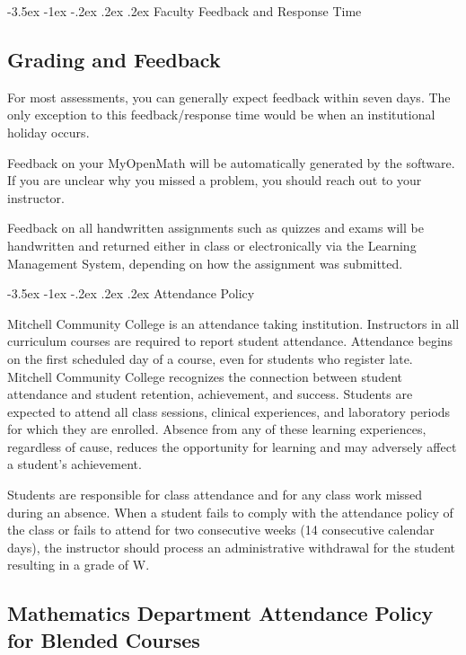 \documentclass{article}
\makeatletter
\renewcommand\section{\@startsection{section}{1}{0pt}%
  {-3.5ex \@plus -1ex \@minus -.2ex}%
  {.2ex \@plus.2ex}%
  {\normalfont\Large\bfseries}} %
\makeatother
\begin{document}
\section{Faculty Feedback and Response Time}

\subsection{Grading and Feedback}

For most assessments, you can generally expect feedback within seven days. The only exception to this feedback/response time would be when an institutional holiday occurs.

Feedback on your MyOpenMath will be automatically generated by the software. If you are unclear why you missed a problem, you should reach out to your instructor.

Feedback on all handwritten assignments such as quizzes and exams will be handwritten and returned either in class or electronically via the Learning Management System, depending on how the assignment was submitted.

\section{Attendance Policy}

Mitchell Community College is an attendance taking institution. Instructors in all curriculum courses are required to report student attendance. Attendance begins on the first scheduled day of a course, even for students who register late. Mitchell Community College recognizes the connection between student attendance and student retention, achievement, and success. Students are expected to attend all class sessions, clinical experiences, and laboratory periods for which they are enrolled. Absence from any of these learning experiences, regardless of cause, reduces the opportunity for learning and may adversely affect a student's achievement.

Students are responsible for class attendance and for any class work missed during an absence. When a student fails to comply with the attendance policy of the class or fails to attend for two consecutive weeks (14 consecutive calendar days), the instructor should process an administrative withdrawal for the student resulting in a grade of W.

\subsection{Mathematics Department Attendance Policy for Blended Courses}
\end{document}
